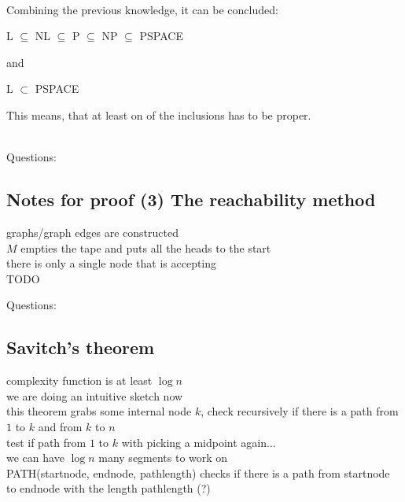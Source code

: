 \documentclass[a4]{scrartcl}
\begin{document}
\ \\
Combining the previous knowledge, it can be concluded:
\begin{center}
L $\subseteq$ NL $\subseteq$ P $\subseteq$ NP $\subseteq$ PSPACE
\end{center}
and
\begin{center}
L $\subset$ PSPACE
\end{center}
This means, that at least on of the inclusions has to be proper.

\ \\
\color{violet} Questions:
\color{black}







\subsection*{Notes for proof (3) The reachability method}
graphs/graph edges are constructed \\
$M$ empties the tape and puts all the heads to the start \\
there is only a single node that is accepting \\



\color{red} TODO
\color{black}

\color{violet} Questions:
\color{black}



\subsection*{Savitch's theorem}
complexity function is at least $\log n$ \\
we are doing an intuitive sketch now \\
this theorem grabs some internal node $k$, check recursively if there is a path from $1$ to $k$ and from $k$ to $n$ \\
test if path from $1$ to $k$ with picking a midpoint again... \\
we can have $\log n$ many segments to work on \\
PATH(startnode, endnode, pathlength) checks if there is a path from startnode to endnode with the length pathlength (?) \\
\end{document}
